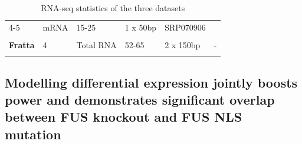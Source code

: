 \begin{longtable}[]{@{}llllll@{}}
\begin{minipage}[t]{0.14\columnwidth}
		{4-5}\strut
	\end{minipage} & \begin{minipage}[t]{0.14\columnwidth}\raggedright\strut
		{mRNA}\strut
	\end{minipage} & \begin{minipage}[t]{0.14\columnwidth}\raggedright\strut
		{15-25}\strut
	\end{minipage} & \begin{minipage}[t]{0.14\columnwidth}\raggedright\strut
		{1 x 50bp}\strut
	\end{minipage} & \begin{minipage}[t]{0.14\columnwidth}\raggedright\strut
		{SRP070906 }\strut
	\end{minipage}\tabularnewline \\
	\begin{minipage}[t]{0.14\columnwidth}\raggedright\strut
		{\textbf{Fratta} }\strut
	\end{minipage} & \begin{minipage}[t]{0.14\columnwidth}\raggedright\strut
		{4}\strut
	\end{minipage} & \begin{minipage}[t]{0.14\columnwidth}\raggedright\strut
		{Total RNA}\strut
	\end{minipage} & \begin{minipage}[t]{0.14\columnwidth}\raggedright\strut
		{52-65}\strut
	\end{minipage} & \begin{minipage}[t]{0.14\columnwidth}\raggedright\strut
		{2 x 150bp}\strut
	\end{minipage} & \begin{minipage}[t]{0.14\columnwidth}\raggedright\strut
		{-}\strut
	\end{minipage}\tabularnewline
	\caption{RNA-seq statistics of the three datasets}
	\label{tab:fus_sequencing}
\end{longtable}


\subsection{Modelling differential expression jointly boosts power and demonstrates significant overlap between FUS knockout and FUS NLS mutation}

